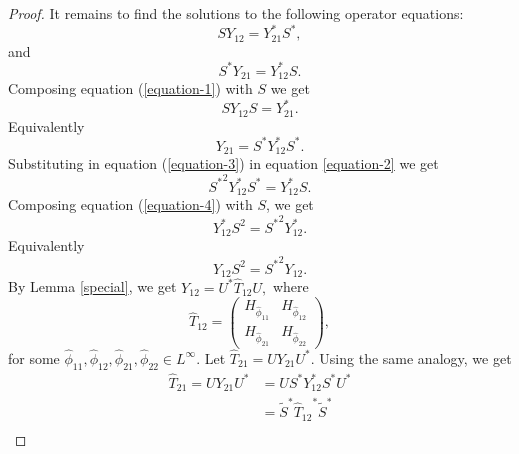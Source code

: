 \documentclass[12pt, reqno]{amsart}
\theoremstyle{definition}
\theoremstyle{remark}
\numberwithin{equation}{section}
\begin{document}
\begin{proof}
             It remains to find the solutions to the following operator equations:
             \begin{equation}\label{equation-1}
                 SY_{12}=Y^*_{21}S^*,
             \end{equation}
             and 
             \begin{equation}\label{equation-2}
                 S^*Y_{21}=Y^*_{12}S.
             \end{equation}
            Composing equation (\ref{equation-1}) with $S$ we get
            \begin{equation*}
                SY_{12}S=Y^*_{21}.
            \end{equation*}
            Equivalently
            \begin{equation}\label{equation-3}
                Y_{21}=S^*Y^*_{12}S^*.
            \end{equation}
            Substituting in equation (\ref{equation-3}) in equation \ref{equation-2} we get
            \begin{equation} \label{equation-4}
                {S^*}^2Y^*_{12}S^*=Y^*_{12}S.
            \end{equation}
            Composing equation (\ref{equation-4}) with $S$, we get
            \begin{equation*}
                 Y^*_{12}S^2={S^*}^2Y^*_{12}.
            \end{equation*}
            Equivalently
            \begin{equation*}
                 Y_{12}S^2={S^*}^2Y_{12}.
            \end{equation*}
            By Lemma \ref{special}, we get
            $Y_{12}=U^*\hat{T}_{12}U,$ where
            \begin{equation*}
            \hat{T}_{12}=
                \begin{pmatrix}
                H_{\hat{\phi}_{11}}&H_{\hat{\phi}_{12}}\\
                H_{\hat{\phi}_{21}}&H_{\hat{\phi}_{22}}
                \end{pmatrix}, 
            \end{equation*}
             for some $\hat{\phi}_{11}, \hat{\phi}_{12}, \hat{\phi}_{21}, \hat{\phi}_{22} \in L^{\infty}.$
            Let $\hat T_{21}=UY_{21}U^*.$ Using the same analogy, we get
            \begin{align*}
                \hat T_{21}=UY_{21}U^*&= U{S}^*Y^*_{12}S^*U^*\\
                &=\tilde{S}^*{\hat{T}_{12}}^*\tilde{S}^*\\

\end{align*}
\end{proof}
\end{document}

